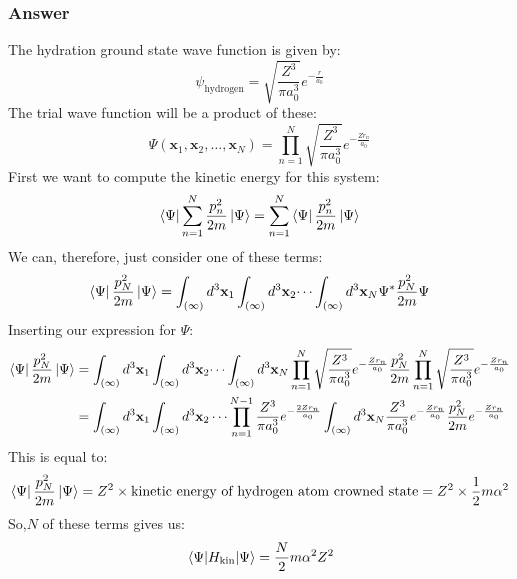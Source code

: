 \documentclass{article}[16pt]
\begin{document}
\subsubsection{Answer}
The hydration ground state wave function is given by:
\begin{equation}
    \psi_{\text{hydrogen}} = \sqrt{\frac{Z^{3}}{\pi a_0^3}}e^{-\frac{r}{a_0}}
\end{equation}
The trial wave function will be a product of these:
\begin{equation}
    \Psi  (\textbf{x}_1, \textbf{x}_2, \dots, \textbf{x}_N) = \prod_{n=1}^{N} \sqrt{\frac{Z^{3}}{\pi a_0^3}}e^{-\frac{Z r_n}{a_0}}
\end{equation}
First we want to compute the kinetic energy for this system:
\begin{align*}
    \bra{\Psi }\sum_{n=1}^{N} \frac{p_n^2}{2m} \ket{\Psi } &= \sum_{n=1}^{N} \bra{\Psi }\frac{p_n^2}{2m} \ket{\Psi } \\ 
\end{align*}
We can, therefore, just consider one of these terms:
\begin{equation}
    \bra{\Psi }\frac{p_N^2}{2m} \ket{\Psi } = \int_{(\infty)} d^3 \textbf{x}_1 \int_{(\infty)} d^3 \textbf{x}_2 \dots \int_{(\infty)} d^3 \textbf{x}_N \Psi^* \frac{p_N^2}{2m} \Psi 
\end{equation}
 Inserting our expression for $\Psi $:
\begin{align*}
    \bra{\Psi }\frac{p_N^2}{2m} \ket{\Psi } &= \int_{(\infty)} d^3 \textbf{x}_1 \int_{(\infty)} d^3 \textbf{x}_2 \dots \int_{(\infty)} d^3 \textbf{x}_N \prod_{n=1}^{N} \sqrt{\frac{Z^{3}}{\pi a_0^3}}e^{-\frac{Zr_n}{a_0}} \frac{p_N^2}{2m} \prod_{n=1}^{N} \sqrt{\frac{Z^{3}}{\pi a_0^3}}e^{-\frac{Zr_n}{a_0}} \\
    &= \int_{(\infty)} d^3 \textbf{x}_1 \int_{(\infty)} d^3 \textbf{x}_2 \dots \prod_{n=1}^{N-1} \frac{Z^{3}}{\pi a_0^3}e^{-\frac{2Zr_n}{a_0}} \int_{(\infty)} d^3 \textbf{x}_N \frac{Z^{3}}{\pi a_0^3}e^{-\frac{Zr_n}{a_0}} \frac{p_N^2}{2m} e^{-\frac{Zr_n}{a_0}} \\
\end{align*}
This is equal to:
\begin{equation}
    \bra{\Psi }\frac{p_N^2}{2m} \ket{\Psi } = Z^2 \times \text{kinetic energy of hydrogen atom crowned state} = Z^2 \times \frac{1}{2} m \alpha^2
\end{equation}
So,$N$ of these terms gives us:
\begin{equation}
    \expval{H_{\text{kin}}}{\Psi } = \frac{N}{2} m \alpha^2 Z^2
\end{equation}
\end{document}
